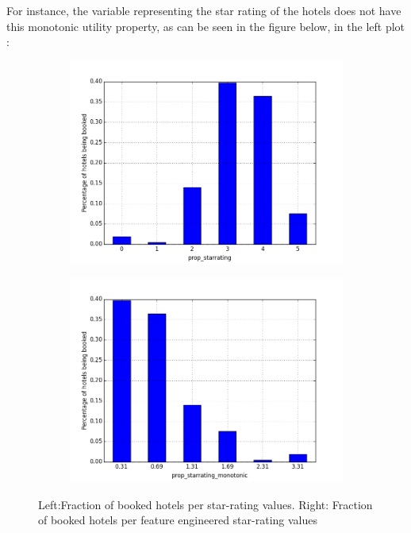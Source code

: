 \documentclass{llncs}
\begin{document}
For instance, the variable representing the star rating of the hotels does not have this monotonic utility property, as can be seen in the figure below, in the left plot :
\begin{figure}[H]
    \centering
    \begin{subfigure}{.5\textwidth}
        \includegraphics[width=1.0\linewidth]{figure_normal_starrate.png}
    \end{subfigure}%
    \begin{subfigure}{.5\textwidth}
        \includegraphics[width=1.0\linewidth]{figure_monotonic_starrate.png}
    \end{subfigure}
       \caption{Left:Fraction of booked hotels per star-rating values. Right: Fraction of booked hotels per feature engineered star-rating values}
        \label{fig3}
\end{figure}
\end{document}
